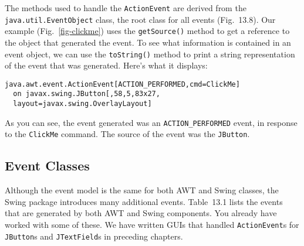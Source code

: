 \pagebreak
The methods used to handle the {\tt ActionEvent} are derived from the
{\tt java.util.EventObject} class, the root class for all events
(Fig.~13.8).  Our example (Fig.~\ref{fig-clickme}) uses
the {\tt getSource()} method to get a reference to the object that
generated the event.  To see what information is contained in an
event object, we can use the {\tt toString()} method to print
a string representation of the event that was generated.  Here's what
it displays:

\begin{jjjlisting}
\begin{lstlisting}
java.awt.event.ActionEvent[ACTION_PERFORMED,cmd=ClickMe]
  on javax.swing.JButton[,58,5,83x27,
  layout=javax.swing.OverlayLayout]
\end{lstlisting}
\end{jjjlisting}

\noindent As you can see, the event generated was an {\tt ACTION\_PERFORMED}
event, in response to the {\tt ClickMe} command.  The source of the event
was the {\tt JButton}.

\subsection{Event Classes}

\noindent Although the event model is the same for both AWT and Swing
classes, the Swing package introduces many additional events.
Table~13.1 lists the events that are generated by both AWT and Swing
components.  You already have worked with some of these. We have
written GUIs that handled {\tt ActionEvent}s for {\tt JButton}s and
{\tt JTextField}s in preceding chapters.

